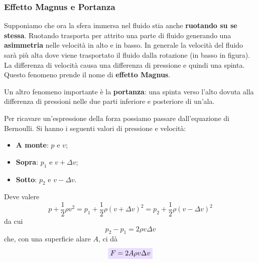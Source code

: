 \documentclass[x11names]{article}
\def\R{1.5}      %
\newcommand{\viola}[1]{\colorbox{yred}{$\displaystyle #1$}}
\begin{document}
	\subsubsection{Effetto Magnus e Portanza}
	Supponiamo che ora la sfera immersa nel fluido stia anche \textbf{ruotando su se stessa}. Ruotando trasporta per attrito una parte di fluido generando una \textbf{asimmetria} nelle velocità in alto e in basso. In generale la velocità del fluido sarà più alta dove viene trasportato il fluido dalla rotazione (in basso in figura). La differenza di velocità causa una differenza di pressione e quindi una spinta. Questo fenomeno prende il nome di \textbf{effetto Magnus}.
	\begin{center}
	\end{center}
	\vspace{2cm}
	Un altro fenomeno importante è la \textbf{portanza}: una spinta verso l'alto dovuta alla differenza di pressioni nelle due parti inferiore e posteriore di un'ala.
	
	Per ricavare un'espressione della forza possiamo passare dall'equazione di Bernoulli. Si hanno i seguenti valori di pressione e velocità:
	\begin{itemize}
		\item \textbf{A monte}: \(p\) e \(v\);
		\item \textbf{Sopra}: \(p_{1}\) e \(v + \Delta v\);
		\item \textbf{Sotto}: \(p_{2}\) e \(v - \Delta v\).
	\end{itemize}
	Deve valere
	\[ 
	p + \frac{1}{2}\rho v^2 = p_{1} + \frac{1}{2}\rho (v+\Delta v)^2= p_{2} + \frac{1}{2}\rho (v-\Delta v)^2
	\]
	da cui 
	\[ 
	p_{2} - p_{1} = 2 \rho v \Delta v
	\]
	che, con una superficie alare \(A\), ci dà
	\begin{equation}
		\viola{F = 2A \rho v \Delta v}
	\end{equation}
	
\end{document}
